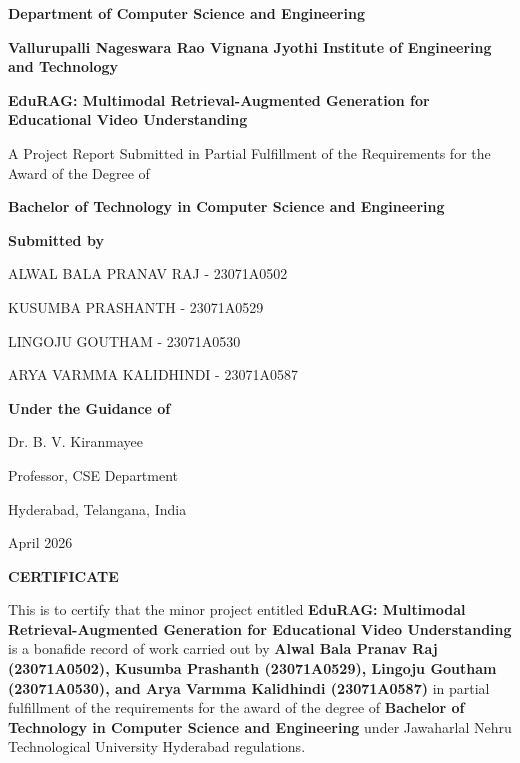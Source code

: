 \documentclass[12pt,a4paper,oneside]{report}
\newcommand{\ProjectTitle}{EduRAG: Multimodal Retrieval-Augmented Generation for Educational Video Understanding}
\newcommand{\InstituteName}{Vallurupalli Nageswara Rao Vignana Jyothi Institute of Engineering and Technology}
\newcommand{\DepartmentName}{Department of Computer Science and Engineering}
\newcommand{\DegreeName}{Bachelor of Technology in Computer Science and Engineering}
\newcommand{\GuideName}{Dr. B. V. Kiranmayee}
\newcommand{\SubmissionMonth}{April 2026}
\begin{document}

\begin{titlepage}
    \centering
    \vspace*{1.5cm}
    {\Large \textbf{\DepartmentName}\par}
    \vspace{0.6cm}
    {\large \textbf{\InstituteName}\par}
    \vspace{1.2cm}
    {\Huge \textbf{\ProjectTitle}\par}
    \vspace{1.4cm}
    {\Large A Project Report Submitted in Partial Fulfillment of the Requirements for the Award of the Degree of\par}
    \vspace{0.5cm}
    {\Large \textbf{\DegreeName}\par}
    \vspace{1.2cm}
    {\large \textbf{Submitted by}\par}
    \vspace{0.6cm}
    {\large
    ALWAL BALA PRANAV RAJ - 23071A0502\par
    KUSUMBA PRASHANTH - 23071A0529\par
    LINGOJU GOUTHAM - 23071A0530\par
    ARYA VARMMA KALIDHINDI - 23071A0587\par}
    \vspace{1.2cm}
    {\large \textbf{Under the Guidance of}\par}
    \vspace{0.4cm}
    {\large \GuideName\par}
    {\large Professor, CSE Department\par}
    \vfill
    {\large Hyderabad, Telangana, India\par}
    {\large \SubmissionMonth\par}
\end{titlepage}

\clearpage
\begin{center}
{\Large \textbf{CERTIFICATE}}
\end{center}

This is to certify that the minor project entitled \textbf{\ProjectTitle} is a bonafide record of work carried out by \textbf{Alwal Bala Pranav Raj (23071A0502), Kusumba Prashanth (23071A0529), Lingoju Goutham (23071A0530), and Arya Varmma Kalidhindi (23071A0587)} in partial fulfillment of the requirements for the award of the degree of \textbf{\DegreeName} under Jawaharlal Nehru Technological University Hyderabad regulations.
\end{document}
